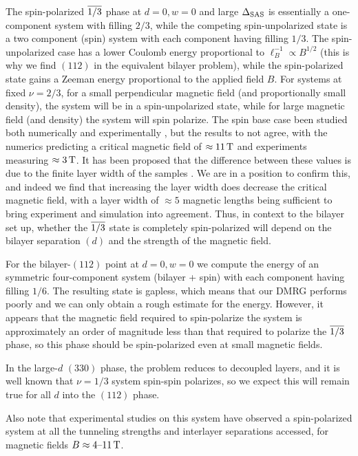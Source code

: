 The spin-polarized $\overline{1/3}$ phase at $d=0, w = 0$ and large $\Delta_\textrm{SAS}$ is essentially a one-component system with filling $2/3$, while the competing spin-unpolarized state is a two component (spin) system with each component having filling $1/3$. 
The spin-unpolarized case has a lower Coulomb energy proportional to $\ell_B^{-1} \propto B^{1/2}$ (this is why we find $(112)$ in the equivalent bilayer problem), while the spin-polarized state  gains a Zeeman energy  proportional to the applied field $B$. 
For systems at fixed $\nu=2/3$, for a small perpendicular magnetic field (and proportionally small density), the system will be in a spin-unpolarized state, while for large magnetic field (and density) the system will spin polarize.
The spin base case been studied both numerically \cite{spinpolED} and experimentally \cite{Eisenstein90}, but the results to not agree, with the numerics predicting a critical magnetic field of $\approx \unit[11]{T}$ and experiments measuring $\approx \unit[3]{T}$. 
It has been proposed that the difference between these values is due to the finite layer width of the samples \cite{Eisenstein90}. 
We are in a position to confirm this, and indeed we find that increasing the layer width does decrease the critical magnetic field, with a layer width of $\approx5$ magnetic lengths being sufficient to bring experiment and simulation into agreement. 
Thus, in context to the bilayer set up, whether the $\overline{1/3}$ state is completely spin-polarized will depend on the bilayer separation $(d)$ and the strength of the magnetic field.

For the bilayer-$(112)$ point at $d = 0, w = 0$  we compute the energy of an  symmetric four-component system (bilayer + spin) with each component having filling $1/6$.
The resulting state is gapless, which means that our DMRG performs poorly and we can only obtain a rough estimate for the energy.
However, it appears that the magnetic field required to spin-polarize the system is approximately an order of magnitude less than that required to polarize the $\overline{1/3}$ phase, so this phase should be spin-polarized even at small magnetic fields.

In the large-$d$ $(330)$ phase, the problem reduces to decoupled layers, and it is well known that $\nu = 1/3$ system spin-spin polarizes, so we expect this will remain true for all $d$ into the $(112)$ phase. 

Also note that experimental studies \cite{Hirayama2002b,Hirayama2004} on this system have observed a spin-polarized system at all the tunneling strengths and interlayer separations accessed, for magnetic fields $B \approx 4\mbox{--}\unit[11]{T}$.


